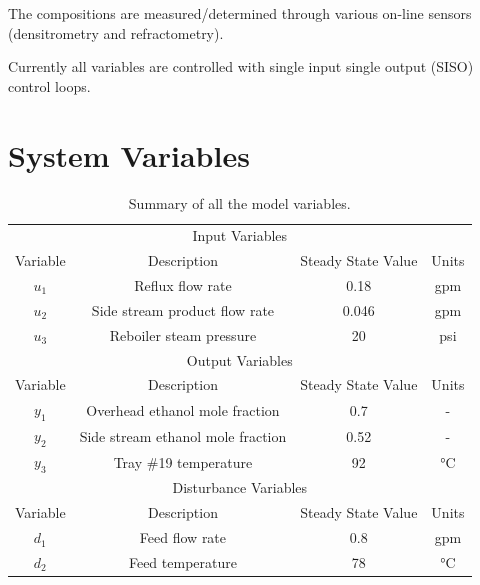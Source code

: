 \documentclass[a4paper,12pt]{article}
\begin{document}
The compositions are measured/determined through various on-line sensors (densitrometry and refractometry).

Currently all variables are controlled with single input single output (SISO) control loops.

\newpage
\section{System Variables}

\begin{table}[h]
	\label{teb:Variables}
	\centering
	\caption{Summary of all the model variables.}
	\begin{tabular}{cccc}
		\hline
		\multicolumn{4}{c}{Input Variables}                                       \\
		
		Variable & Description                       & Steady State Value & Units \\
		\hline
		$u_1$       & Reflux flow rate                  & 0.18               & gpm   \\
		$u_2$       & Side stream product flow rate     & 0.046              & gpm   \\
		$u_3$       & Reboiler steam pressure           & 20                 & psi   \\
		\hline
		\multicolumn{4}{c}{Output Variables}                                      \\
		
		Variable & Description                       & Steady State Value & Units \\
		\hline
		$y_1$       & Overhead ethanol mole fraction    & 0.7                & -     \\
		$y_2$       & Side stream ethanol mole fraction & 0.52               & -     \\
		$y_3$       & Tray \#19 temperature             & 92                 & \si{\celsius} \\
		\hline
		\multicolumn{4}{c}{Disturbance Variables}                                 \\
		
		Variable & Description                       & Steady State Value & Units \\
		\hline
		$d_1$       & Feed flow rate                    & 0.8                & gpm   \\
		$d_2$       & Feed temperature                  & 78                 & \si{\celsius} \\\hline
	\end{tabular}
\end{table}
\end{document}
